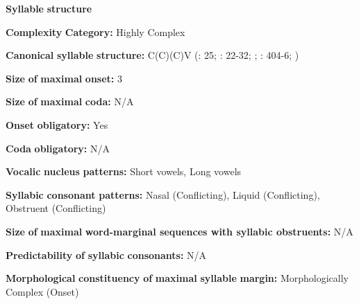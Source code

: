 \begin{styleBody}
\textbf{Syllable} \textbf{structure}
\end{styleBody}

\begin{styleBody}
\textbf{Complexity} \textbf{Category:} Highly Complex
\end{styleBody}

\begin{styleBody}
\textbf{Canonical} \textbf{syllable} \textbf{structure:} C(C)(C)V (\citealt{Hanson2010}: 25; \citealt{Matteson1965}: 22-32; \citealt{MattesonPike1958}; \citealt{Lin1997}: 404-6; \citealt{Lin1993})
\end{styleBody}

\begin{styleBody}
\textbf{Size} \textbf{of} \textbf{maximal} \textbf{onset:} 3
\end{styleBody}

\begin{styleBody}
\textbf{Size} \textbf{of} \textbf{maximal} \textbf{coda:} N/A
\end{styleBody}

\begin{styleBody}
\textbf{Onset} \textbf{obligatory:} Yes
\end{styleBody}

\begin{styleBody}
\textbf{Coda} \textbf{obligatory:} N/A
\end{styleBody}

\begin{styleBody}
\textbf{Vocalic} \textbf{nucleus} \textbf{patterns:} Short vowels, Long vowels
\end{styleBody}

\begin{styleBody}
\textbf{Syllabic} \textbf{consonant} \textbf{patterns:} Nasal (Conflicting), Liquid (Conflicting), Obstruent (Conflicting)
\end{styleBody}

\begin{styleBody}
\textbf{Size} \textbf{of} \textbf{maximal} \textbf{word{}-marginal sequences with syllabic obstruents:} N/A
\end{styleBody}

\begin{styleBody}
\textbf{Predictability} \textbf{of} \textbf{syllabic} \textbf{consonants:} N/A
\end{styleBody}

\begin{styleBody}
\textbf{Morphological} \textbf{constituency} \textbf{of} \textbf{maximal} \textbf{syllable} \textbf{margin:} Morphologically Complex (Onset)
\end{styleBody}

